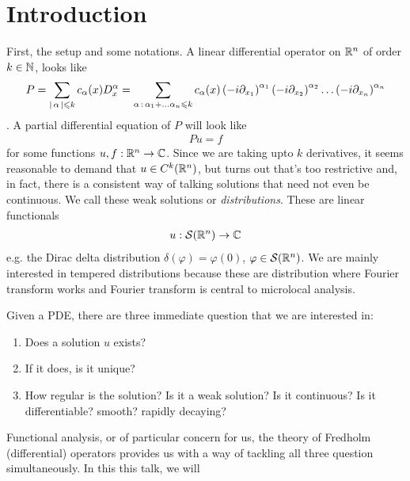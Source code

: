 \documentclass{article}
\begin{document}
\section{Introduction}

First, the setup and some notations. A linear differential operator on ${\mathbb R}^n$ of order $k \in {\ensuremath {\mathbb N}}$, looks like 
\begin{align*}
P = \sum_{\left|\, \alpha\,\right| \leqslant k} c_\alpha(x) D^\alpha_x = \sum_{\alpha \, : \, \alpha_1 + \dots \alpha_n \leqslant k} c_\alpha(x) \left(-i \partial_{x_1}\right)^{\alpha_1}\left(-i \partial_{x_2}\right)^{\alpha_2} \dots \left(-i \partial_{x_n}\right)^{\alpha_n}
\end{align*}
. A partial differential equation of $P$ will look like
\begin{align*}
P u = f
\end{align*}
for some functions $u, f : {\mathbb R}^n \to {\ensuremath {\mathbb C}}$. Since we are taking upto $k$ derivatives, it seems reasonable to demand that $u \in C^k({\mathbb R}^n)$, but turns out that's too restrictive and, in fact, there is a consistent way of talking solutions that need not even be continuous. We call these weak solutions or \emph{distributions}. These are linear functionals 
\begin{align*}
u : \mathcal{S}({\mathbb R}^n) \to {\ensuremath {\mathbb C}}
\end{align*}
e.g. the Dirac delta distribution $\delta(\varphi) = \varphi(0)$, $\varphi \in \mathcal{S}({\mathbb R}^n)$. We are mainly interested in tempered distributions because these are distribution where Fourier transform works and Fourier transform is central to microlocal analysis. 

Given a PDE, there are three immediate question that we are interested in: 
\begin{enumerate}
    \item Does a solution $u$ exists? 
    \item If it does, is it unique? 
    \item How regular is the solution? Is it a weak solution? Is it continuous? Is it differentiable? smooth? rapidly decaying? 
\end{enumerate}

Functional analysis, or of particular concern for us, the theory of Fredholm (differential) operators provides us with a way of tackling all three question simultaneously. In this this talk, we will 
\end{document}
